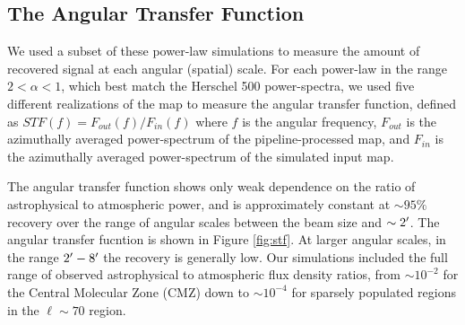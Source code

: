 
\subsection{The Angular Transfer Function}
\label{sec:STF}

We used a subset of these power-law simulations to measure the amount of recovered signal at each
angular (spatial) scale.
For each power-law in the range $2<\alpha<1$, which best match the Herschel 500
\um power-spectra, we used five different realizations of the map to measure
the angular transfer function, defined as $STF(f) = F_{out}(f)/F_{in}(f)$ where
$f$ is the angular frequency, $F_{out}$ is the azimuthally averaged
power-spectrum of the pipeline-processed map, and $F_{in}$ is the azimuthally
averaged power-spectrum of the simulated input map.


The angular transfer function shows only weak dependence on the ratio of
astrophysical to atmospheric power, and is approximately constant at $\sim95\%$
recovery over the range of angular scales between the beam size and
$\sim2\mbox{$^\prime$}$.  The angular transfer fucntion is shown in Figure \ref{fig:stf}.  At larger angular scales, in the range $2\mbox{$^\prime$}-8\mbox{$^\prime$}$ the
recovery is generally low.  Our simulations included the full
range of observed astrophysical to atmospheric flux density ratios, from $\sim10^{-2}$
for the Central Molecular Zone (CMZ) down to $\sim10^{-4}$ for sparsely
populated regions in the $\ell\sim70$ region.


